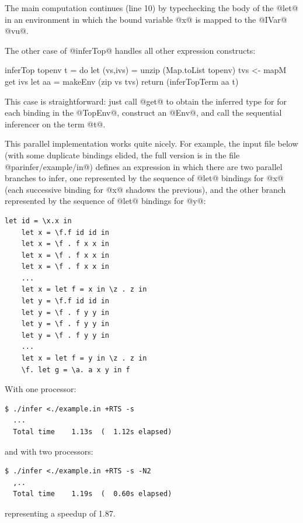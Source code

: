 The main computation continues (line 10) by typechecking the body of
the @let@ in an environment in which the bound variable @x@ is mapped
to the @IVar@ @vu@.

The other case of @inferTop@ handles all other expression constructs:

\begin{numhaskell}
inferTop topenv t = do
    let (vs,ivs) = unzip (Map.toList topenv)
    tvs <- mapM get ivs
    let aa = makeEnv (zip vs tvs)
    return (inferTopTerm aa t)
\end{numhaskell}

\noindent This case is straightforward: just call @get@ to obtain the
inferred type for for each binding in the @TopEnv@, construct an
@Env@, and call the sequential inferencer on the term @t@.

This parallel implementation works quite nicely.  For example, the
input file below (with some duplicate bindings elided, the full
version is in the file @parinfer/example/in@) defines an expression in
which there are two parallel branches to infer, one represented by
the sequence of @let@ bindings for @x@ (each successive binding for
@x@ shadows the previous), and the other branch represented by the
sequence of @let@ bindings for @y@:

{\small \begin{verbatim}
let id = \x.x in
    let x = \f.f id id in
    let x = \f . f x x in
    let x = \f . f x x in
    let x = \f . f x x in
    ...
    let x = let f = x in \z . z in
    let y = \f.f id id in
    let y = \f . f y y in
    let y = \f . f y y in
    let y = \f . f y y in
    ...
    let x = let f = y in \z . z in
    \f. let g = \a. a x y in f
\end{verbatim}}

\noindent With one processor:

{\small \begin{verbatim}
$ ./infer <./example.in +RTS -s
  ...
  Total time    1.13s  (  1.12s elapsed)
\end{verbatim}}

\noindent and with two processors:

{\small \begin{verbatim}
$ ./infer <./example.in +RTS -s -N2
  ,..
  Total time    1.19s  (  0.60s elapsed)
\end{verbatim}}

\noindent representing a speedup of 1.87.


